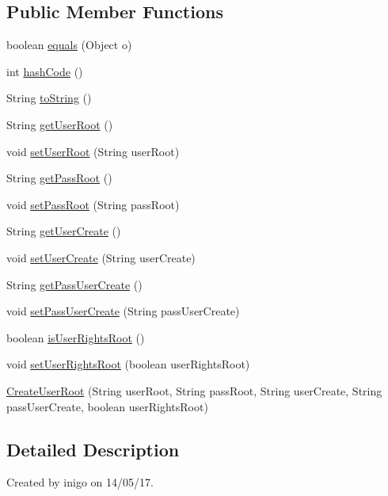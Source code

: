 \subsection*{Public Member Functions}
\begin{DoxyCompactItemize}
\item 
boolean \hyperlink{class_create_user_root_ad00b10c9a8ea120dbef823e1cbf2961d}{equals} (Object o)
\item 
int \hyperlink{class_create_user_root_a20b56a7302f659762a408ee77f94ce7f}{hash\+Code} ()
\item 
String \hyperlink{class_create_user_root_a162c5272b7e633c81aca4077088eeccb}{to\+String} ()
\item 
String \hyperlink{class_create_user_root_ad3a6203b1afee594d5e0214b721bbabd}{get\+User\+Root} ()
\item 
void \hyperlink{class_create_user_root_a1ef78fab3a8f64515e47e133a5e40a00}{set\+User\+Root} (String user\+Root)
\item 
String \hyperlink{class_create_user_root_a2e2dd9b254a65fad94d21b811a3dbd55}{get\+Pass\+Root} ()
\item 
void \hyperlink{class_create_user_root_a1ec9f4160b07eb21578fc405a5e9fca2}{set\+Pass\+Root} (String pass\+Root)
\item 
String \hyperlink{class_create_user_root_a3bf1bdb585e44c54f6bb40dd08bd54bf}{get\+User\+Create} ()
\item 
void \hyperlink{class_create_user_root_a288697775d0b4d8e61d15e587d007c6c}{set\+User\+Create} (String user\+Create)
\item 
String \hyperlink{class_create_user_root_a2706b425eeb1642e2b3e3dce74909e1a}{get\+Pass\+User\+Create} ()
\item 
void \hyperlink{class_create_user_root_a1fa56655ebc5cfce86df78429d22a22b}{set\+Pass\+User\+Create} (String pass\+User\+Create)
\item 
boolean \hyperlink{class_create_user_root_a46105498a89702d50c7ee93b000878cc}{is\+User\+Rights\+Root} ()
\item 
void \hyperlink{class_create_user_root_a20fbe3d3cda3ea5bcbc238e4baab039d}{set\+User\+Rights\+Root} (boolean user\+Rights\+Root)
\item 
\hyperlink{class_create_user_root_a089337f6faedcd6f4850ac9bf60c7d85}{Create\+User\+Root} (String user\+Root, String pass\+Root, String user\+Create, String pass\+User\+Create, boolean user\+Rights\+Root)
\end{DoxyCompactItemize}


\subsection{Detailed Description}
Created by inigo on 14/05/17. 

